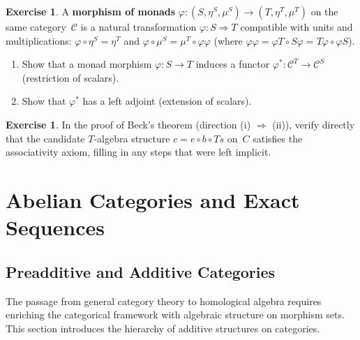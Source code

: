 \documentclass[a4paper,12pt]{book}
\theoremstyle{definition}
\newtheorem{exercise}[definition]{Exercise}
\theoremstyle{plain}
\theoremstyle{remark}
\begin{document}
\begin{exercise}\label{exer:monad-maps}
A \textbf{morphism of monads} $\varphi\colon(S,\eta^S,\mu^S)\to
(T,\eta^T,\mu^T)$ on the same category~$\mathcal{C}$ is a natural
transformation $\varphi\colon S\Rightarrow T$ compatible with units and
multiplications:
$\varphi\circ\eta^S = \eta^T$ and
$\varphi\circ\mu^S = \mu^T\circ\varphi\varphi$
(where $\varphi\varphi = \varphi T\circ S\varphi = T\varphi\circ\varphi S$).
\begin{enumerate}[label=(\alph*)]
\item Show that a monad morphism $\varphi\colon S\to T$ induces a functor
    $\varphi^*\colon\mathcal{C}^T\to\mathcal{C}^S$ (restriction of scalars).
\item Show that $\varphi^*$ has a left adjoint (extension of scalars).
\end{enumerate}
\end{exercise}

\begin{exercise}\label{exer:monad-coequaliser-detail}
In the proof of Beck's theorem (direction (i) $\Rightarrow$ (ii)),
verify directly that the candidate $T$-algebra structure
$c = e\circ b\circ Ts$ on~$C$ satisfies the associativity axiom, filling
in any steps that were left implicit.
\end{exercise}


\chapter{Abelian Categories and Exact Sequences}\label{ch:abelian}
\minitoc

\section{Preadditive and Additive Categories}\label{sec:preadditive}

The passage from general category theory to homological algebra requires
enriching the categorical framework with algebraic structure on morphism sets.
This section introduces the hierarchy of additive structures on categories.
\end{document}
